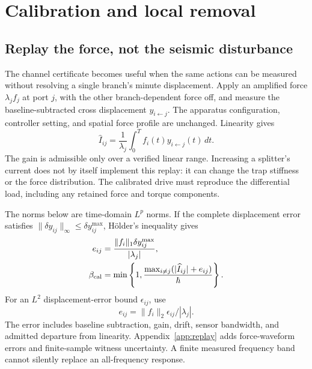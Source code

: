 \documentclass[aps,pra,reprint,amsmath,amssymb,longbibliography,floatfix]{revtex4-2}
\newcommand{\norm}[1]{\lVert#1\rVert}
\begin{document}
\section{Calibration and local removal}
\subsection{Replay the force, not the seismic disturbance}
The channel certificate becomes useful when the same actions can be measured without resolving a single branch's minute displacement. Apply an amplified force $\lambda_j f_j$ at port $j$, with the other branch-dependent force off, and measure the baseline-subtracted cross displacement $y_{i\leftarrow j}$. The apparatus configuration, controller setting, and spatial force profile are unchanged. Linearity gives
\begin{equation}
\widehat I_{ij}=\frac1{\lambda_j}\int_0^T f_i(t)y_{i\leftarrow j}(t)\,dt.
\label{eq:replay}
\end{equation}
The gain is admissible only over a verified linear range. Increasing a splitter's current does not by itself implement this replay: it can change the trap stiffness or the force distribution. The calibrated drive must reproduce the differential load, including any retained force and torque components.

The norms below are time-domain $L^p$ norms. If the complete displacement error satisfies $\norm{\delta y_{ij}}_\infty\le\delta y_{ij}^{\max}$, H\"older's inequality gives
\begin{equation}
\begin{split}
e_{ij}&=\frac{\norm{f_i}_1\delta y_{ij}^{\max}}{|\lambda_j|},\\
\beta_{\rm cal}&=\min\left\{1,\frac{\max_{i\ne j}(|\widehat I_{ij}|+e_{ij})}{\hbar}\right\}.
\end{split}
\label{eq:calerror}
\end{equation}
For an $L^2$ displacement-error bound $\epsilon_{ij}$, use
\begin{equation}
e_{ij}=\norm{f_i}_2\epsilon_{ij}/|\lambda_j|.
\label{eq:l2error}
\end{equation}
The error includes baseline subtraction, gain, drift, sensor bandwidth, and admitted departure from linearity. Appendix~\ref{app:replay} adds force-waveform errors and finite-sample witness uncertainty. A finite measured frequency band cannot silently replace an all-frequency response.
\end{document}
